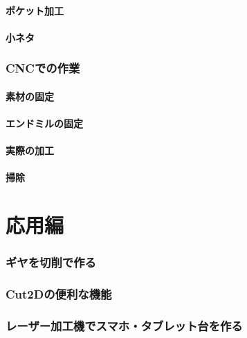 \documentclass[onecolumn]{preport}
\begin{document}
\subsection{ポケット加工}
\subsection{小ネタ}

\section{CNCでの作業}
\subsection{素材の固定}
\subsection{エンドミルの固定}
\subsection{実際の加工}
\subsection{掃除}

\part{応用編}
\section{ギヤを切削で作る }
\section{Cut2Dの便利な機能}
\section{レーザー加工機でスマホ・タブレット台を作る}



\end{document}
